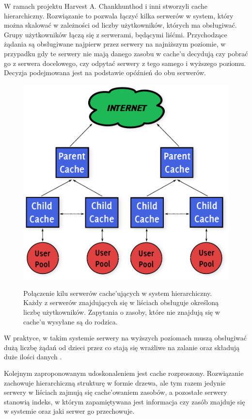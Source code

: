 \documentclass[a4paper,11pt]{scrartcl}
\newcommand{\s}{ }
\newcommand{\kesz}{cache}
\newcommand{\keszu}{cache'u}
\newcommand{\keszujacych}{cache'ujących}
\newcommand{\keszowaniem}{cache'owaniem}
\begin{document}
W ramach projektu Harvest \cite{bowman1994harvest} A. Chankhunthod i inni \cite{chankhunthod1995hierarchical} stworzyli \kesz\s hierarchiczny. Rozwiązanie to pozwala łączyć kilka serwerów w system, który można skalować w zależności od liczby użytkowników, których ma obsługiwać. Grupy użytkowników łączą się z serwerami, będącymi liśćmi. Przychodzące żądania są obsługiwane najpierw przez serwery na najniższym poziomie, w przypadku gdy te serwery nie mają danego zasobu w \keszu\s decydują czy pobrać go z serwera docelowego, czy odpytać serwery z tego samego i wyższego poziomu. Decyzja podejmowana jest na podstawie opóźnień do obu serwerów.

\begin{figure}[h]
\centering
\includegraphics[width=0.8\linewidth]{img/hierarchical.pdf}
\label{fig_cache_hierarchical}
\caption{Połączenie kilu serwerów \keszujacych\s w system hierarchiczny. Każdy z serwerów znajdujących się w liściach obsługuje określoną liczbę użytkowników. Zapytania o zasoby, które nie znajdują się w \keszu\s wysyłane są do rodzica.}
\end{figure}

W praktyce, w takim systemie serwery na wyższych poziomach muszą obsługiwać dużą liczbę żądań od dzieci przez co stają się wrażliwe na zalanie oraz składują duże ilości danych \cite{povey1997distributed}.

Kolejnym zaproponowanym udoskonaleniem jest \kesz\s rozproszony. Rozwiązanie zachowuje hierarchiczną strukturę w formie drzewa, ale tym razem jedynie serwery w liściach zajmują się \keszowaniem\s zasobów, a pozostałe serwery stanowią indeks, w którym zapamiętywana jest informacja czy zasób znajduje się w systemie oraz jaki serwer go przechowuje.
\end{document}
